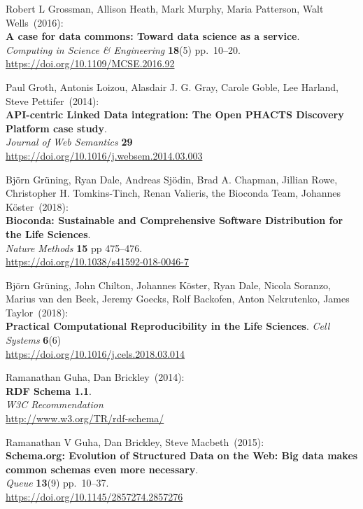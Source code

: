 \begin{thebibliography}{9}
Robert L Grossman, Allison Heath, Mark Murphy, Maria Patterson,
Walt Wells~(2016): \\
\textbf{A case for data commons: Toward data science as a service}.\\
\emph{Computing in Science \& Engineering} \textbf{18}(5) pp.~10--20.\\
\url{https://doi.org/10.1109/MCSE.2016.92}

Paul Groth, Antonis Loizou, Alasdair J. G. Gray, Carole Goble, Lee
Harland, Steve Pettifer~(2014): \\
\textbf{API-centric Linked Data integration: {The Open PHACTS Discovery Platform} case study}.\\
\emph{Journal of Web Semantics} \textbf{29} \\
\url{https://doi.org/10.1016/j.websem.2014.03.003}

Björn Grüning, Ryan Dale, Andreas Sjödin, Brad A. Chapman,
Jillian Rowe, Christopher H. Tomkins-Tinch, Renan Valieris, the Bioconda
Team, Johannes Köster~(2018): \\
\textbf{Bioconda: Sustainable and Comprehensive Software Distribution
for the Life Sciences}.\\
\emph{Nature Methods} \textbf{15} pp 475--476.\\
\url{https://doi.org/10.1038/s41592-018-0046-7}

Björn Grüning, John Chilton, Johannes Köster, Ryan Dale, Nicola
Soranzo, Marius van den Beek, Jeremy Goecks, Rolf Backofen, Anton
Nekrutenko, James Taylor~(2018): \\
\textbf{Practical Computational Reproducibility in the Life Sciences}.
\emph{Cell Systems} \textbf{6}(6)\\
\url{https://doi.org/10.1016/j.cels.2018.03.014}

Ramanathan Guha, Dan Brickley~(2014): \\
\textbf{RDF Schema 1.1}.\\
\emph{W3C Recommendation} \\
\url{http://www.w3.org/TR/rdf-schema/}

Ramanathan V Guha, Dan Brickley, Steve Macbeth~(2015): \\
\textbf{Schema.org: Evolution of Structured Data on the Web: Big data
makes common schemas even more necessary}.\\
\emph{Queue} \textbf{13}(9) pp.~10--37.\\
\url{https://doi.org/10.1145/2857274.2857276}


\end{thebibliography}
